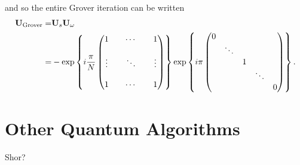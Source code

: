 and so the entire Grover iteration can be written
\begin{equation}
\begin{split}
{\bf U}_{\text{Grover}} =& {\bf U}_s {\bf U}_\omega\\ 
=& - \exp \left\lbrace  i\frac{\pi}{N}
                \begin{pmatrix}
                    1      &        & \cdots &      & 1 \\
                    \\
                    \vdots &        & \ddots &      & \vdots \\
                    \\
                    1      &        & \cdots &      & 1
                \end{pmatrix}
\right\rbrace
\exp \left\lbrace  i\pi
                \begin{pmatrix}
                    0       &        &        &        &  \\
                            & \ddots &        &        &  \\
                            &        & 1      &        &  \\
                            &        &        & \ddots &  \\
                            &        &        &        & 0
                \end{pmatrix}
\right\rbrace.
\end{split}
\end{equation}



%
%
%
%
%
%
%
\section{Other Quantum Algorithms}

Shor?
